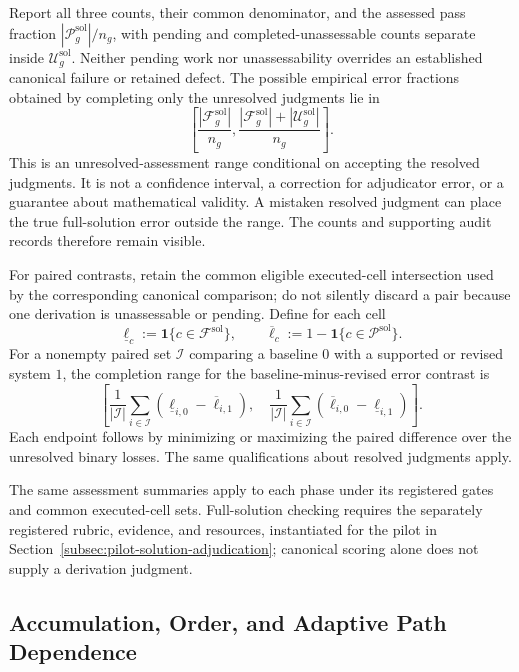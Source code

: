 \documentclass[10pt]{article} %
\providecommand{\1}{\mathbf{1}}  %
\theoremstyle{remark}
\theoremstyle{definition}
\begin{document}
Report all three counts, their common denominator, and the assessed
pass fraction $|\mathcal P_g^{\mathrm{sol}}|/n_g$, with pending and
completed-unassessable counts separate inside $\mathcal U_g^{\mathrm{sol}}$.
Neither pending work nor unassessability overrides an established
canonical failure or retained defect. The possible empirical
error fractions obtained by completing only the unresolved judgments
lie in
\begin{equation}
\left[
\frac{|\mathcal F_g^{\mathrm{sol}}|}{n_g},
\frac{|\mathcal F_g^{\mathrm{sol}}|
+|\mathcal U_g^{\mathrm{sol}}|}{n_g}
\right].
\label{eq:solution-assessment-range}
\end{equation}
This is an unresolved-assessment range conditional on accepting the
resolved judgments. It is not a confidence interval, a correction for
adjudicator error, or a guarantee about mathematical validity. A
mistaken resolved judgment can place the true full-solution error
outside the range. The counts and supporting audit records therefore
remain visible.

For paired contrasts, retain the common eligible executed-cell
intersection used by the corresponding canonical comparison; do not
silently discard a pair because one derivation is unassessable or pending. Define
for each cell
\[
\underline\ell_c:=\mathbf 1\{c\in\mathcal F^{\mathrm{sol}}\},
\qquad
\overline\ell_c:=1-\mathbf 1\{c\in\mathcal P^{\mathrm{sol}}\}.
\]
For a nonempty paired set $\mathcal I$ comparing a baseline $0$ with
a supported or revised system $1$, the completion range for the
baseline-minus-revised error contrast is
\begin{equation}
\left[
\frac1{|\mathcal I|}\sum_{i\in\mathcal I}
(\underline\ell_{i,0}-\overline\ell_{i,1}),
\quad
\frac1{|\mathcal I|}\sum_{i\in\mathcal I}
(\overline\ell_{i,0}-\underline\ell_{i,1})
\right].
\label{eq:solution-paired-assessment-range}
\end{equation}
Each endpoint follows by minimizing or maximizing the paired
difference over the unresolved binary losses. The same qualifications
about resolved judgments apply.

The same assessment summaries apply to each phase under its registered
gates and common executed-cell sets. Full-solution checking requires the
separately registered rubric, evidence, and resources, instantiated for
the pilot in Section~\ref{subsec:pilot-solution-adjudication}; canonical
scoring alone does not supply a derivation judgment.

\subsection{Accumulation, Order, and Adaptive Path Dependence}
\label{subsec:adaptive-path-dependence}
\end{document}
